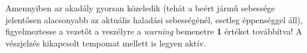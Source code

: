\begin{enumerate}
		Amennyiben az akadály gyorsan közeledik (tehát a beért jármű sebessége jelentősen alacsonyabb az aktuális haladási sebességénél, esetleg éppenséggel áll), figyelmeztesse a vezetőt a veszélyre a \textit{warning} bemenetre \textbf{1} értéket továbbítva! A vészjelzés kikapcsolt tempomat mellett is legyen aktív.
\end{enumerate}
